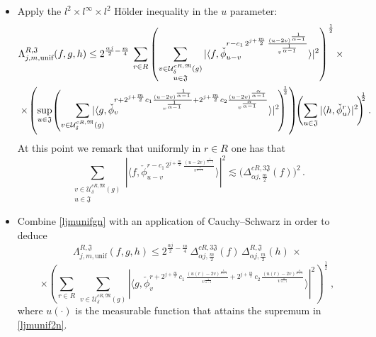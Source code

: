 \documentclass[a4paper,reqno]{amsart}
\numberwithin{equation}{section}
\theoremstyle{definition}
\def\beq{\begin{equation}}
\def\eeq{\end{equation}}
\def\beq{\begin{equation}}
\def\eeq{\end{equation}}
\def\a{\alpha}
\def\beq{\begin{equation}}
\def\eeq{\end{equation}}
\def\beq{\begin{equation}}
\def\eeq{\end{equation}}
\def\d{\delta}
\def\L{\Lambda}
\begin{document}
\begin{itemize}
\item Apply the $l^2\times l^{\infty}\times l^2$ H\"older inequality in the $u$ parameter:
\begin{align}
	&\L_{j,m,\textrm{unif}}^{R,\mathfrak{J}}(f,g,h)\leq 2^{\frac{\a j}{2}-\frac{m}{4}}\,\sum_{r\in R}
	\left(\sum_{\substack{v\in \mathcal{U}_{\d}^{c R,\mathfrak{M}}(g)\\[.2ex] u\in \mathfrak{J}}}
	|\langle f,  \check{\phi}_{u-v}^{r- c_1\,2^{j+\frac{m}{2}}\,\frac{(u-2v)^{\frac{1}{\a-1}}}{v^{\frac{1}{\a-1}}}}\rangle|^2\right)^{\frac{1}{2}}\times\nonumber\\
	&\times\! \left(\sup_{u\in \mathfrak{J}}\!\left(
	\sum_{v\in \mathcal{U}_{\d}^{c R,\mathfrak{M}}(g)}
	\hspace{-.5cm}
	|\langle g,  \check{\phi}_{v}^{r+2^{j+\frac{m}{2}}c_1\frac{(u-2v)^{\frac{1}{\a-1}}}{v^{\frac{1}{\a-1}}}+
		2^{j+\frac{m}{2}}c_2\frac{(u-2v)^{\frac{\a}{\a-1}}}{v^{\frac{\a}{\a-1}}}}\rangle|^2\!\right)^{\!\!\!\frac{1}{2}}\right)\!\!
	\left(\sum_{u\in \mathfrak{J}}|\langle h,  \check{\phi}_{u}^{r}\rangle|^2\!\right)^{\!\!\!\frac{1}{2}}.\raisetag{.5\baselineskip} \label{ljmunif2n}
\end{align}
At this point we remark that uniformly in $r\in R$ one has that
\beq\label{ljmunifgn}
\sum_{\substack{v\in \mathcal{U}_{\d}^{c R,\mathfrak{M}}(g)\\[.2ex] u\in \mathfrak{J}}}
  |\langle f,  \check{\phi}_{u-v}^{r- c_1\,2^{j+\frac{m}{2}}\,\frac{(u-2v)^{\frac{1}{\a-1}}}{v^{\frac{1}{\a-1}}}}\rangle|^2\lesssim
\big(\Delta_{\a j,\frac{m}{2}}^{cR, 3\mathfrak{J}} (f)\big)^2\,.
\eeq

\item Combine \eqref{ljmunifgn} with an application of Cauchy--Schwarz in order to deduce
\beq\label{ljmunif4n}
\L_{j,m,\textrm{unif}}^{R,\mathfrak{J}}(f,g,h)\leq  2^{\frac{\a j}{2}-\frac{m}{4}}\,\Delta_{\a j,\frac{m}{2}}^{cR, 3\mathfrak{J}} (f)\, \Delta_{\a j,\frac{m}{2}}^{R, \mathfrak{J}} (h)\,\times
\eeq
$$\times\left(\sum_{r\in R}\,\sum_{v\in \mathcal{U}_{\d}^{c R,\mathfrak{M}}(g)} |\langle g,  \check{\phi}_{v}^{r+2^{j+\frac{m}{2}}\,c_1\,\frac{(u(r)-2v)^{\frac{1}{\a-1}}}{v^{\frac{1}{\a-1}}}+
2^{j+\frac{m}{2}}\,c_2\,\frac{(u(r)-2v)^{\frac{\a}{\a-1}}}{v^{\frac{\a}{\a-1}}}}\rangle|^2\right)^{\frac{1}{2}}\:,$$
where $u(\cdot)$ is the measurable function that attains the supremum in \eqref{ljmunif2n}.


\end{itemize}
\end{document}
